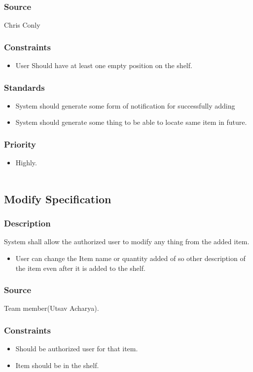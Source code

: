 \subsubsection{Source}
Chris Conly
\subsubsection{Constraints}
\begin{itemize}
\item User Should have at least one empty position on the shelf.
\end{itemize}
\subsubsection{Standards}
\begin{itemize}
\item System should generate some form of notification for successfully adding  
\item System should generate some thing to be able to locate same item in future.
\end{itemize}
\subsubsection{Priority}
\begin{itemize}
\item Highly.\\ \\
\end{itemize}

\subsection{Modify Specification}
\subsubsection{Description}
System shall allow the authorized user to modify any thing from the added item. 
\begin{itemize}
\item User can change the Item name or quantity added of so other description of the item even after it is added to the shelf.
\end{itemize}
\subsubsection{Source}
Team member(Utsav Acharya).
\subsubsection{Constraints}
\begin{itemize}
\item Should be authorized user for that item.
\item Item should be in the shelf.
\end{itemize}
